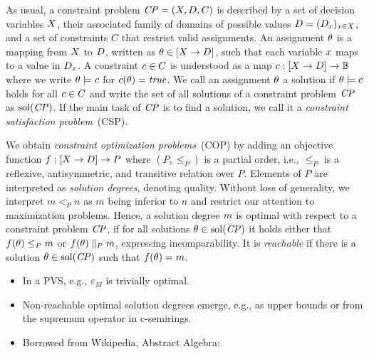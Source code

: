 As usual, a constraint problem $\mathit{CP} = (X, D, C)$ is described
by a set of decision variables $X$, their associated family of domains of possible values
$D = (D_x)_{x \in X}$, and a set of constraints $C$ that restrict valid assignments.
An assignment $\theta$ is a mapping from $X$ to $D$, written as $\theta \in [X \to D]$, such that each variable $x$ maps to
a value in $D_x$. A constraint $c \in C$ is understood as a map $c : [X \to D] \to \mathbb{B}$
where we write $\theta \models c$ for $c(\theta) = \mathit{true}$. We call
an assignment $\theta$ a solution if $\theta \models c$ holds for all $c \in C$ and
write the set of all solutions of a constraint problem $\mathit{CP}$ as $\mathrm{sol}(\mathit{CP})$. If the main task of $\mathit{CP}$ is
to find a solution, we call it a \emph{constraint satisfaction problem}~(CSP).

We obtain \emph{constraint optimization problems}~(COP) by adding an objective function $f : [X \to D] \to P$
where $(P, \leq_P)$ is a partial order, i.e., $\leq_P$ is a reflexive, antisymmetric, and transitive relation over $P$.
Elements of $P$ are interpreted as \emph{solution degrees}, denoting quality. Without loss of generality, we interpret
$m <_P n$ as $m$ being inferior to $n$ and restrict our attention to maximization problems.
Hence, a solution degree $m$ is optimal with respect to a constraint problem $\mathit{CP}$, 
if for all solutions $\theta \in \mathrm{sol}(\mathit{CP})$ it holds either that $f(\theta) \leq_P m$ or 
$f(\theta) \parallel_P m$, expressing incomparability.  It is \emph{reachable} if there is a solution $\theta \in \mathrm{sol}(\mathit{CP})$ such that 
$f(\theta) = m$. 

\begin{itemize}
\item In a PVS, e.g., $\varepsilon_M$ is trivially optimal.
\item Non-reachable optimal solution degrees emerge, e.g., as
 upper bounds or from the supremum operator in c-semirings. 

\item Borrowed from Wikipedia, Abstract Algebra: 
\end{itemize}

